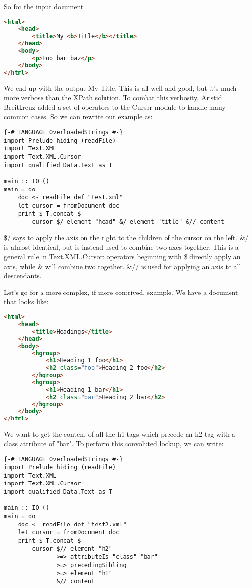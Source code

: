 So for the input document:

\begin{lstlisting}[language=HTML]
  <html>
    <head>
        <title>My <b>Title</b></title>
    </head>
    <body>
        <p>Foo bar baz</p>
    </body>
</html>
\end{lstlisting}

We end up with the output My Title. This is all well and good, but it's much more verbose than the XPath solution. To combat this verbosity, Aristid Breitkreuz added a set of operators to the Cursor module to handle many common cases. So we can rewrite our example as:

\begin{lstlisting}
{-# LANGUAGE OverloadedStrings #-}
import Prelude hiding (readFile)
import Text.XML
import Text.XML.Cursor
import qualified Data.Text as T

main :: IO ()
main = do
    doc <- readFile def "test.xml"
    let cursor = fromDocument doc
    print $ T.concat $
        cursor $/ element "head" &/ element "title" &// content
\end{lstlisting}%

\$/ says to apply the axis on the right to the children of the cursor on the left. \&/ is almost identical, but is instead used to combine two axes together. This is a general rule in Text.XML.Cursor: operators beginning with \$ directly apply an axis, while \& will combine two together. \&// is used for applying an axis to all descendants.

Let's go for a more complex, if more contrived, example. We have a document that looks like:

\begin{lstlisting}[language=HTML]
  <html>
    <head>
        <title>Headings</title>
    </head>
    <body>
        <hgroup>
            <h1>Heading 1 foo</h1>
            <h2 class="foo">Heading 2 foo</h2>
        </hgroup>
        <hgroup>
            <h1>Heading 1 bar</h1>
            <h2 class="bar">Heading 2 bar</h2>
        </hgroup>
    </body>
</html>
\end{lstlisting}

We want to get the content of all the h1 tags which precede an h2 tag with a class attribute of "bar". To perform this convoluted lookup, we can write:

\begin{lstlisting}
{-# LANGUAGE OverloadedStrings #-}
import Prelude hiding (readFile)
import Text.XML
import Text.XML.Cursor
import qualified Data.Text as T

main :: IO ()
main = do
    doc <- readFile def "test2.xml"
    let cursor = fromDocument doc
    print $ T.concat $
        cursor $// element "h2"
               >=> attributeIs "class" "bar"
               >=> precedingSibling
               >=> element "h1"
               &// content
\end{lstlisting}%

